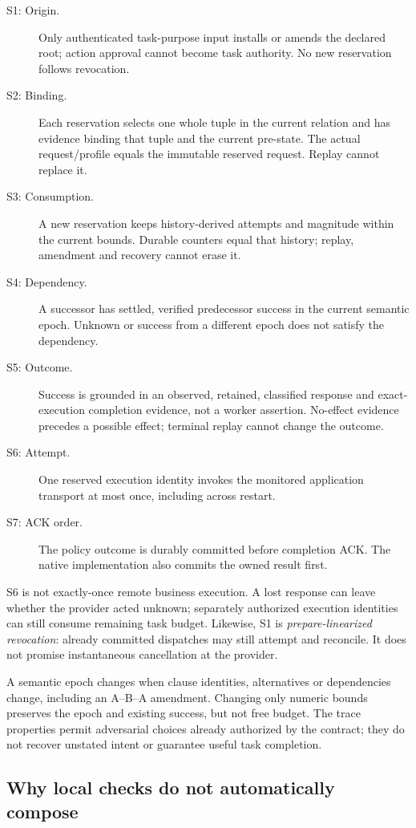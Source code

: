 \documentclass[letterpaper,twocolumn,10pt]{article}
\begin{document}
\begin{description}
\item[S1: Origin.] Only authenticated task-purpose input installs or amends
the declared root; action approval cannot become task authority. No new
reservation follows revocation.
\item[S2: Binding.] Each reservation selects one whole tuple in the current
relation and has evidence binding that tuple and the current pre-state.
The actual request/profile equals the immutable reserved request. Replay
cannot replace it.
\item[S3: Consumption.] A new reservation keeps history-derived attempts and
magnitude within the current bounds. Durable counters equal that history;
replay, amendment and recovery cannot erase it.
\item[S4: Dependency.] A successor has settled, verified predecessor success
in the current semantic epoch. Unknown or success from a different epoch
does not satisfy the dependency.
\item[S5: Outcome.] Success is grounded in an observed, retained, classified
response and exact-execution completion evidence, not a worker assertion.
No-effect evidence precedes a possible effect; terminal replay cannot change
the outcome.
\item[S6: Attempt.] One reserved execution identity invokes the monitored
application transport at most once, including across restart.
\item[S7: ACK order.] The policy outcome is durably committed before completion
ACK. The native implementation also commits the owned result first.
\end{description}

S6 is not exactly-once remote business execution. A lost response can leave
whether the provider acted unknown; separately authorized execution identities
can still consume remaining task budget. Likewise, S1 is
\emph{prepare-linearized revocation}: already committed dispatches may still
attempt and reconcile. It does not promise instantaneous cancellation at the
provider.

A semantic epoch changes when clause identities, alternatives or dependencies
change, including an A--B--A amendment. Changing only numeric bounds preserves
the epoch and existing success, but not free budget. The trace properties
permit adversarial choices already authorized by the contract; they do not
recover unstated intent or guarantee useful task completion.

\subsection{Why local checks do not automatically compose}
\end{document}
